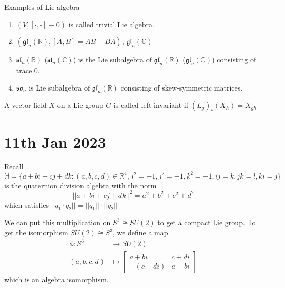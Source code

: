 \documentclass[11pt,a4paper]{scrarticle}
\theoremstyle{definition}
\theoremstyle{greenbox}
\newcommand{\R}{\mathbb{R}}
\newcommand{\C}{\mathbb{C}}
\newcommand{\Ho}{\mathbb{H}}
\begin{document}
    Examples of Lie algebra - \begin{example}
       \begin{enumerate}
        \item $ (V, [\cdot, \cdot] \equiv 0 )$ is called trivial Lie algebra. 
        \item $ (\mathfrak{gl}_{n}(\R), [A,B ]  = AB - BA )$, $ \mathfrak{gl}_{n}(\C)$
        \item $ \mathfrak{sl}_n(\R) $ ($ \mathfrak{sl}_n (\C) $) is the Lie subalgebra of $ \mathfrak{gl}_{n}(\R) $ ($ \mathfrak{gl}_{n}(\C) $)  consisting of trace $ 0 $.
        \item $ \mathfrak{so}_n $ is Lie subalgebra of $ \mathfrak{gl}_{n}(\R) $ consisting of skew-symmetric matrices.
       \end{enumerate}
    \end{example}
    \begin{defn}
        A vector field $ X $ on a Lie group $ G $ is called left invariant if $ (L_{g})_{*}(X_{h}) = X_{gh} $
    \end{defn}

    \section{11th Jan 2023}

    Recall $ \Ho =  \{a+bi+cj+dk : (a,b,c,d) \in \R^{4},  \, i^{2} = -1, j^{2} = -1, k^{2} = -1,  ij=k, jk = l, ki=j \} $ is the quaternion division algebra  with the norm 
    \[ ||a+ bi+ cj+dk||^{2} = a^{2}+ b^{2}+c^{2}+d^{2} \] which satisfies $ ||q_{1} \cdot  q_{2}|| = ||q_{1}|| \cdot ||q_{2}||$

    We can put this multiplication on $ S^{3} \cong SU(2) $ to get a compact Lie group. To get the isomorphism $ SU(2) \cong S^{3} $, we define a map 
    \begin{align*}
        \phi :S^{3} & \to SU(2)\\
            (a,b,c,d) & \mapsto \begin{bmatrix}
                a+bi & c+di\\
                -(c-di)&  a-bi
            \end{bmatrix}
    \end{align*}
    which is an algebra isomorphism. 
\end{document}
